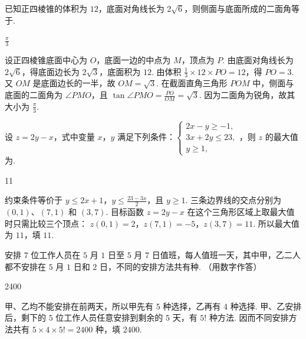 \begin{problem}
已知正四棱锥的体积为 \(12\)，底面对角线长为 \(2\sqrt{6}\)，则侧面与底面所成的二面角等于\fillinblank{}.
\end{problem}

\begin{answer}
\(\frac{\pi}{3}\)
\end{answer}

\begin{solution}
设正四棱锥底面中心为 \(O\)，底面一边的中点为 \(M\)，顶点为 \(P\). 由底面对角线长为 \(2\sqrt{6}\)，得底面边长为 \(2\sqrt{3}\)，底面积为 \(12\). 由体积 \(\frac{1}{3}\times12\times PO=12\)，得 \(PO=3\). 又 \(OM\) 是底面边长的一半，故 \(OM=\sqrt{3}\). 在截面直角三角形 \(POM\) 中，侧面与底面的二面角为 \(\angle PMO\)，且 \(\tan\angle PMO=\frac{PO}{OM}=\sqrt{3}\). 因为二面角为锐角，故其大小为 \(\frac{\pi}{3}\).
\end{solution}

\begin{problem}
设 \(z = 2y - x\)，式中变量 \(x\)，\(y\) 满足下列条件：\(\begin{cases}
2x - y \geqslant -1,\\
3x + 2y \leqslant 23,\\
y \geqslant 1,
\end{cases}\)，则 \(z\) 的最大值为\fillinblank{}.
\end{problem}

\begin{answer}
11
\end{answer}

\begin{solution}
约束条件等价于 \(y\leqslant2x+1\)，\(y\leqslant\frac{23-3x}{2}\)，且 \(y\geqslant1\). 三条边界线的交点分别为 \((0,1)\)、\((7,1)\) 和 \((3,7)\). 目标函数 \(z=2y-x\) 在这个三角形区域上取最大值时只需比较三个顶点：
\(z(0,1)=2\)，\(z(7,1)=-5\)，\(z(3,7)=11\). 所以最大值为 \(11\)，填 \(11\).
\end{solution}

\begin{problem}
安排 \(7\) 位工作人员在 \(5\) 月 \(1\) 日至 \(5\) 月 \(7\) 日值班，每人值班一天，其中甲，乙二人都不安排在 \(5\) 月 \(1\) 日和 \(2\) 日，不同的安排方法共有\fillinblank{}\(\text{种}\). （用数字作答）
\end{problem}

\begin{answer}
2400
\end{answer}

\begin{solution}
甲、乙均不能安排在前两天，所以甲先有 \(5\) 种选择，乙再有 \(4\) 种选择. 甲、乙安排后，剩下的 \(5\) 位工作人员任意安排到剩余的 \(5\) 天，有 \(5!\) 种方法. 因而不同安排方法共有 \(5\times4\times5!=2400\) 种，填 \(2400\).
\end{solution}

